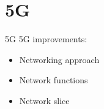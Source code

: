 \section{5G}
\begin{frame}{5G}
  5G improvements:
  \begin{itemize}
  \item<1-> Networking approach
  \item<2-> Network functions
  \item<3-> Network slice
  \end{itemize}
\end{frame}
